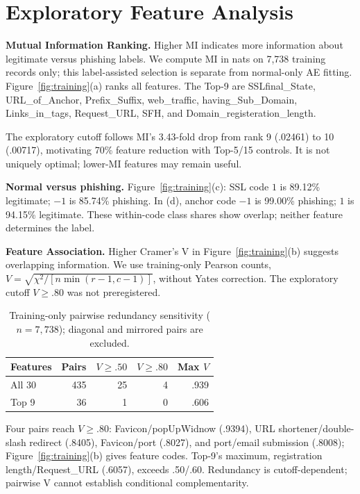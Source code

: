 \documentclass[11pt]{article}
\begin{document}
\section{Exploratory Feature Analysis}
\textbf{Mutual Information Ranking.} Higher MI indicates more information about legitimate versus phishing labels. We compute MI in nats on 7,738 training records only; this label-assisted selection is separate from normal-only AE fitting. Figure~\ref{fig:training}(a) ranks all features. The Top-9 are SSLfinal\_State, URL\_of\_Anchor, Prefix\_Suffix, web\_traffic, having\_Sub\_Domain, Links\_in\_tags, Request\_URL, SFH, and Domain\_registeration\_length.

The exploratory cutoff follows MI's 3.43-fold drop from rank 9 (.02461) to 10 (.00717), motivating 70\% feature reduction with Top-5/15 controls. It is not uniquely optimal; lower-MI features may remain useful.

\textbf{Normal versus phishing.} Figure~\ref{fig:training}(c): SSL code $1$ is 89.12\% legitimate; $-1$ is 85.74\% phishing. In (d), anchor code $-1$ is 99.00\% phishing; $1$ is 94.15\% legitimate. These within-code class shares show overlap; neither feature determines the label.

\textbf{Feature Association.} Higher Cramer's V in Figure~\ref{fig:training}(b) suggests overlapping information. We use training-only Pearson counts, $V=\sqrt{\chi^2/[n\min(r-1,c-1)]}$, without Yates correction. The exploratory cutoff $V\geq.80$ was not preregistered.

\begin{table}[h]\centering\small
\begin{tabular}{lrrrr}\toprule
Features & Pairs & $V\geq.50$ & $V\geq.80$ & Max $V$\\\midrule
All 30 & 435 & 25 & 4 & .939\\
Top 9 & 36 & 1 & 0 & .606\\\bottomrule
\end{tabular}
\caption{Training-only pairwise redundancy sensitivity ($n=7,738$); diagonal and mirrored pairs are excluded.}\label{tab:v}
\end{table}
Four pairs reach $V\geq.80$: Favicon/popUpWidnow (.9394), URL shortener/double-slash redirect (.8405), Favicon/port (.8027), and port/email submission (.8008); Figure~\ref{fig:training}(b) gives feature codes. Top-9's maximum, registration length/Request\_URL (.6057), exceeds .50/.60. Redundancy is cutoff-dependent; pairwise V cannot establish conditional complementarity.
\end{document}
